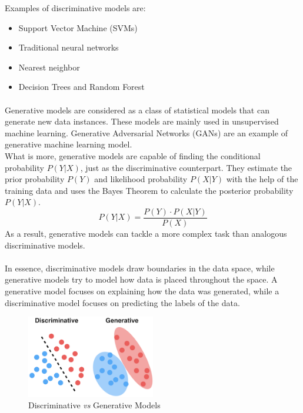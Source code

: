 Examples of discriminative models are:

\begin{itemize}
	\item Support Vector Machine (SVMs)

	\item Traditional neural networks

	\item Nearest neighbor

	\item Decision Trees and Random Forest
\end{itemize}

\paragraph{}

Generative models are considered as a class of statistical models that can generate
new data instances. These models are mainly used in unsupervised machine
learning. Generative Adversarial Networks (GANs) are an example of generative machine
learning model.\\ What is more, generative models are capable of finding the
conditional probability $P(Y|X)$, just as the discriminative counterpart. They
estimate the prior probability $P(Y)$ and likelihood probability $P(X|Y)$ with
the help of the training data and uses the Bayes Theorem to calculate the
posterior probability $P(Y|X)$.
\begin{equation}
	P(Y|X) = \frac{P(Y) \cdot P(X|Y)}{P(X)}
\end{equation}
As a result, generative models can tackle a more complex task than analogous
discriminative models.

\paragraph{}

In essence, discriminative models draw boundaries in the data space, while
generative models try to model how data is placed throughout the space. A generative
model focuses on explaining how the data was generated, while a discriminative
model focuses on predicting the labels of the data.

\begin{figure}[H]
	\centering
	\includegraphics[width=0.5\textwidth]{
		images/01_Introduction_discriminativeAndGenerative.png
	}
	\caption{Discriminative \textit{vs} Generative Models}
	\label{descriminative_generative}
\end{figure}